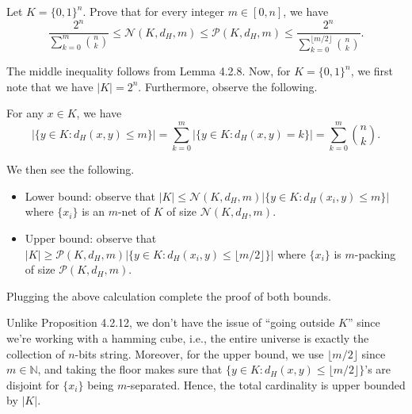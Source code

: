 \begin{problem*}[Exercise 4.2.16]\label{ex4.2.16}
	Let \(K = \{ 0, 1 \} ^n\). Prove that for every integer \(m \in [0, n]\), we have
	\[
		\frac{2^n}{\sum_{k=0}^{m} \binom{n}{k}}
		\leq \mathcal{N} (K, d_H, m)
		\leq \mathcal{P} (K, d_H, m)
		\leq \frac{2^n}{\sum_{k=0}^{\lfloor m / 2 \rfloor } \binom{n}{k}}.
	\]
\end{problem*}
\begin{answer}
	The middle inequality follows from Lemma 4.2.8. Now, for \(K = \{ 0, 1 \} ^n\), we first note that we have \(\lvert K \rvert = 2^n\). Furthermore, observe the following.

	\begin{claim}
		For any \(x \in K\), we have
		\[
			\lvert \{ y \in K \colon d_H(x, y) \leq m\}  \rvert
			= \sum_{k=0}^{m} \lvert \{ y \in K \colon d_H(x, y) = k\}  \rvert
			= \sum_{k=0}^{m} \binom{n}{k}.
		\]
	\end{claim}

	We then see the following.
	\begin{itemize}
		\item Lower bound: observe that \(\lvert K \rvert \leq \mathcal{N} (K, d_H, m) \lvert \{ y \in K \colon d_H(x_i, y) \leq m \}  \rvert \) where \(\{ x_i \} \) is an \(m\)-net of \(K\) of size \(\mathcal{N} (K, d_H, m)\).
		\item Upper bound: observe that \(\lvert K \rvert \geq \mathcal{P} (K, d_H, m) \lvert \{ y \in K \colon d_H(x_i, y) \leq \lfloor m / 2 \rfloor \} \rvert \) where \(\{ x_i \} \) is \(m\)-packing of size \(\mathcal{P} (K, d_H, m)\).
	\end{itemize}
	Plugging the above calculation complete the proof of both bounds.
\end{answer}

\begin{remark}
	Unlike Proposition 4.2.12, we don't have the issue of ``going outside \(K\)'' since we're working with a hamming cube, i.e., the entire universe is exactly the collection of \(n\)-bits string. Moreover, for the upper bound, we use \(\lfloor m / 2 \rfloor \) since \(m \in \mathbb{N} \), and taking the floor makes sure that \(\{ y \in K \colon d_H(x, y) \leq \lfloor m / 2 \rfloor  \} \)'s are disjoint for \(\{ x_i \} \) being \(m\)-separated. Hence, the total cardinality is upper bounded by \(\lvert K \rvert \).
\end{remark}